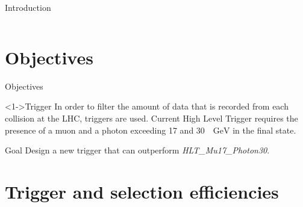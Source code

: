 \documentclass[aspectratio = 1610, xcolor = dvipsnames]{beamer}
\newcommand{\GeV}{\textrm{ }\mathrm{GeV}}
\newcommand{\red}{\textcolor{unipd}}
\begin{document}
\begin{frame}[t]{Introduction}
\begin{columns}[c]
        \end{columns}


	\end{frame}
	
	
    \section{Objectives}

    \begin{frame}[t]{Objectives}

        \begin{block}<1->{Trigger}
            In order to filter the amount of data that is recorded from each collision at the LHC, triggers are used. Current High Level Trigger requires the presence of a muon and a photon exceeding 17 and 30 $\GeV$ in the final state.
        \end{block}
        
        \vspace{1cm}
        
        \begin{alertblock}{\red{Goal}}
            Design a new trigger that can outperform {\it HLT\_Mu17\_Photon30}.
        \end{alertblock}

    \end{frame}
	
	
	\section{Trigger and selection efficiencies}
    
\end{document}
